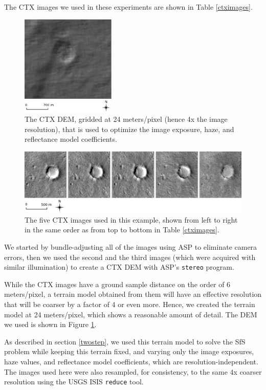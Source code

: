 \documentclass[draft,linenumbers]{agujournal}
\begin{document}
The CTX images we used in these experiments are shown in Table \ref{ctximages}.

\begin{figure}[h!]
\centering
\includegraphics[width=0.4\textwidth]{hires_dem.jpg}
\caption[sfs]{The CTX DEM, gridded at 24 meters/pixel (hence 4x the image resolution), that is used to optimize the image exposure, haze, and reflectance model coefficients.}
\label{hires}
\end{figure}

\begin{figure}[h!]
\centering
\includegraphics[width=\textwidth]{sfs_mars_fig1}
\caption[sfs]{The five CTX images used in this example, shown from left to right in the same order as from top to bottom in Table \ref{ctximages}.}
\label{sfs1}
\end{figure}

We started by bundle-adjusting all of the images using ASP to eliminate camera errors, then we used the second and the third images (which were acquired with similar illumination) to create a CTX DEM with ASP's \texttt{stereo} program. 

While the CTX images have a ground sample distance on the order of 6 meters/pixel, a terrain model obtained from them will have an effective resolution that will be coarser by a factor of 4 or even more. Hence, we created the terrain model at 24 meters/pixel, which shows a reasonable amount of detail. The DEM we used is shown in Figure \ref{hires}. 

As described in section \ref{twostep}, we used this terrain model to solve the SfS problem while keeping this terrain fixed, and varying only the image exposures, haze values, and reflectance model coefficients, which are resolution-independent. The images used here were also resampled, for consistency, to the same 4x coarser resolution using the USGS ISIS \texttt{reduce} tool.  
\end{document}
